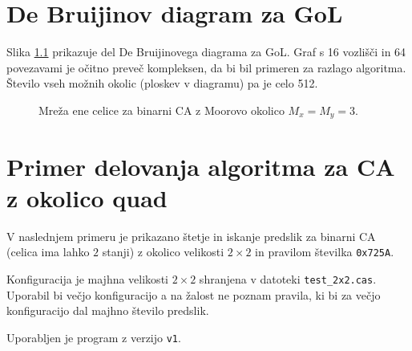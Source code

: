 \documentclass[12pt,a4paper,openany,twoside]{book}
\begin{document}

\appendix

\chapter{De Bruijinov diagram za GoL}

Slika \ref{network_single_moore} prikazuje del De Bruijinovega diagrama za GoL.
Graf s 16 vozlišči in 64 povezavami je očitno preveč kompleksen, da bi bil primeren za razlago algoritma.
Število vseh možnih okolic (ploskev v diagramu) pa je celo 512.

\begin{figure}[htb]
\centerline{}
\caption[Mreža ene celice za GoL.]{Mreža ene celice za binarni CA z Moorovo okolico \(M_x=M_y=3\).}
\label{network_single_moore}
\end{figure}

\chapter{Primer delovanja algoritma za CA z okolico quad}

V naslednjem primeru je prikazano štetje in iskanje predslik
za binarni CA (celica ima lahko \(2\) stanji) z okolico velikosti \(2 \times 2\)
in pravilom številka \verb|0x725A|.

Konfiguracija je majhna velikosti \(2 \times 2\) shranjena v datoteki \verb|test_2x2.cas|.
Uporabil bi večjo konfiguracijo a na žalost ne poznam pravila,
ki bi za večjo konfiguracijo dal majhno število predslik.

Uporabljen je program \cite{Jeras2016-algirithm} z verzijo \verb|v1|.
\end{document}
